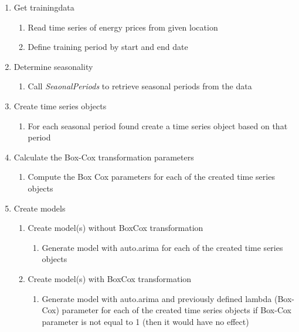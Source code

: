 \begin{enumerate}
	\item Get trainingdata
	
	\begin{enumerate}
		\item Read time series of energy prices from given location
		\item Define training period by start and end date
	\end{enumerate}
	\item Determine seasonality
	
	\begin{enumerate}
		\item Call \textit{SeaonalPeriods} to retrieve seasonal periods from the data
	\end{enumerate}
	
	\item Create time series objects
	
	\begin{enumerate}
		\item For each seasonal period found create a time series object based on that period
	\end{enumerate}
	
	\item Calculate the Box-Cox transformation parameters
	
	\begin{enumerate}
		\item Compute the Box Cox parameters for each of the created time series objects
	\end{enumerate}
	
	\item Create models
	
	\begin{enumerate}
		\item Create model(s) without BoxCox transformation
		
		\begin{enumerate}
			\item Generate model with auto.arima for each of the created time series objects 
		\end{enumerate}
		
		\item Create model(s) with BoxCox transformation
		
		\begin{enumerate}
			\item Generate model with auto.arima and previously defined lambda (Box-Cox) parameter for each of the created time series objects if Box-Cox parameter is not equal to 1 (then it would have no effect)
		

\end{enumerate}
\end{enumerate}
\end{enumerate}
